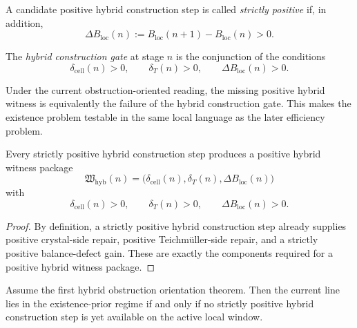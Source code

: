 \begin{definition}
\label{def:strictly-positive-hybrid-construction}
A candidate positive hybrid construction step is called \emph{strictly positive} if, in addition,
\[
  \Delta B_{\mathrm{loc}}(n)
  :=
  B_{\mathrm{loc}}(n+1)-B_{\mathrm{loc}}(n)
  >0.
\]
\end{definition}

\begin{definition}
\label{def:hybrid-construction-gate}
The \emph{hybrid construction gate} at stage $n$ is the conjunction of the conditions
\[
  \delta_{\mathrm{cell}}(n)>0,
  \qquad
  \delta_T(n)>0,
  \qquad
  \Delta B_{\mathrm{loc}}(n)>0.
\]
\end{definition}

\begin{remark}
\label{rem:existence-obstruction-as-gate-failure}
Under the current obstruction-oriented reading, the missing positive hybrid witness is equivalently the failure of the hybrid construction gate.
This makes the existence problem testable in the same local language as the later efficiency problem.
\end{remark}

\begin{proposition}
\label{prop:positive-hybrid-witness-construction-implies-witness-existence}
Every strictly positive hybrid construction step produces a positive hybrid witness package
\[
  \mathfrak W_{\mathrm{hyb}}(n)
  =
  \bigl(
    \delta_{\mathrm{cell}}(n),
    \delta_T(n),
    \Delta B_{\mathrm{loc}}(n)
  \bigr)
\]
with
\[
  \delta_{\mathrm{cell}}(n)>0,
  \qquad
  \delta_T(n)>0,
  \qquad
  \Delta B_{\mathrm{loc}}(n)>0.
\]
\end{proposition}

\begin{proof}
By definition, a strictly positive hybrid construction step already supplies positive crystal-side repair, positive Teichm\"uller-side repair, and a strictly positive balance-defect gain.
These are exactly the components required for a positive hybrid witness package.
\end{proof}

\begin{proposition}
\label{prop:current-existence-obstruction-equivalent-to-absence-of-construction}
Assume the first hybrid obstruction orientation theorem.
Then the current line lies in the existence-prior regime if and only if no strictly positive hybrid construction step is yet available on the active local window.
\end{proposition}

